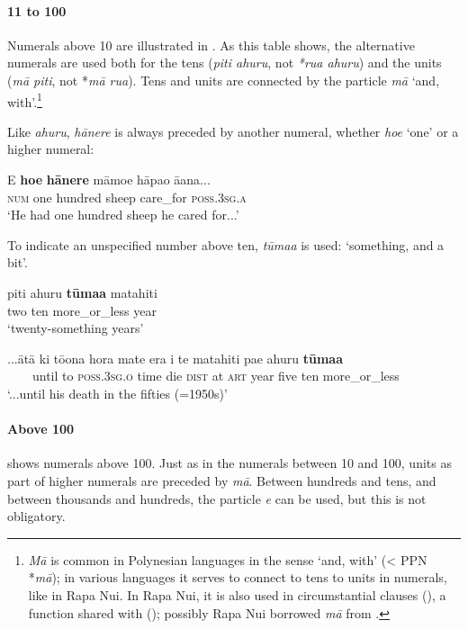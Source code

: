 \paragraph{11 to 100} Numerals above 10 are illustrated in . As this table shows, the alternative numerals are used both for the tens (\textit{piti {\ꞌ}ahuru}, not \textit{*rua {\ꞌ}ahuru}) and the units (\textit{mā piti}, not *\textit{mā rua}). Tens and units are connected by the particle \textit{mā} ‘and, with’.\footnote{\label{fn:167}\textit{Mā} is common in Polynesian languages in the sense ‘and, with’ ({\textless} PPN *\textit{mā}); in various languages it serves to connect to tens to units in numerals, like in Rapa Nui. In Rapa Nui, it is also used in circumstantial clauses (), a function shared with  (\citealt[107, 196]{AcadémieTahitienne1986}); possibly Rapa Nui borrowed \textit{m}\textit{ā} from .} 

Like \textit{{\ꞌ}ahuru}, \textit{hānere} is always preceded by another numeral, whether \textit{ho{\ꞌ}e} ‘one’ or a higher numeral:

\ea\label{ex:4.11}
\gll E \textbf{ho{\ꞌ}e} \textbf{hānere} māmoe hāpa{\ꞌ}o {\ꞌ}ā{\ꞌ}ana... \\
\textsc{num} one hundred sheep care\_for \textsc{poss.3sg.a} \\

\glt
‘He had one hundred sheep he cared for...’ \textstyleExampleref{[R490.002]} 
\z

To indicate an unspecified number above ten, \textit{tūma{\ꞌ}a} is used: ‘something, and a bit’.

\ea\label{ex:4.12}
\gll piti {\ꞌ}ahuru \textbf{tūma{\ꞌ}a} matahiti \\
two ten more\_or\_less year \\

\glt 
‘twenty-something years’
\z

\ea\label{ex:4.13}
\gll ...{\ꞌ}ātā ki tō{\ꞌ}ona hora mate era {\ꞌ}i te matahiti pae {\ꞌ}ahuru \textbf{tūma{\ꞌ}a} \\
~~~~until to \textsc{poss.3sg.o} time die \textsc{dist} at \textsc{art} year five ten more\_or\_less \\

\glt 
‘...until his death in the fifties (=1950s)’ \textstyleExampleref{[R539-1.493]}
\z

\paragraph{Above 100}  shows numerals above 100. Just as in the numerals between 10 and 100, units as part of higher numerals are preceded by \textit{mā}. Between hundreds and tens, and between thousands and hundreds, the particle \textit{e} can be used, but this is not obligatory. 


